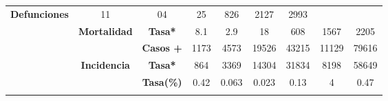 \begin{tabular}{ccc|cccccc|}
		\multirow{-2}{*}{\cellcolor[HTML]{FFFFC7}\textbf{Defunciones}} &
		\multicolumn{1}{c|}{\multirow{-2}{*}{\cellcolor[HTML]{FFFFC7}11}} &
		\multicolumn{1}{c|}{\multirow{-2}{*}{\cellcolor[HTML]{FFFFC7}04}} &
		\multicolumn{1}{c|}{\multirow{-2}{*}{\cellcolor[HTML]{FFFFC7}25}} &
		\multicolumn{1}{c|}{\multirow{-2}{*}{\cellcolor[HTML]{FFFFC7}826}} &
		\multicolumn{1}{c|}{\multirow{-2}{*}{\cellcolor[HTML]{FFFFC7}2127}} &
		\multirow{-2}{*}{\cellcolor[HTML]{FFFFC7}2993} \\ \cline{3-9} 
		\rowcolor[HTML]{FFFFC7} 
		\multicolumn{1}{|c|}{\cellcolor[HTML]{FFFFC7}} &
		\multicolumn{1}{c|}{\multirow{-2}{*}{\cellcolor[HTML]{FFFFC7}\textbf{Mortalidad}}} &
		\textbf{Tasa*} &
		\multicolumn{1}{c|}{\cellcolor[HTML]{FFFFC7}8.1} &
		\multicolumn{1}{c|}{\cellcolor[HTML]{FFFFC7}2.9} &
		\multicolumn{1}{c|}{\cellcolor[HTML]{FFFFC7}18} &
		\multicolumn{1}{c|}{\cellcolor[HTML]{FFFFC7}608} &
		\multicolumn{1}{c|}{\cellcolor[HTML]{FFFFC7}1567} &
		2205 \\ \cline{2-9} 
		\rowcolor[HTML]{FFFFC7} 
		\multicolumn{1}{|c|}{\cellcolor[HTML]{FFFFC7}} &
		\multicolumn{1}{c|}{\cellcolor[HTML]{FFFFC7}} &
		\textbf{Casos +} &
		\multicolumn{1}{c|}{\cellcolor[HTML]{FFFFC7}1173} &
		\multicolumn{1}{c|}{\cellcolor[HTML]{FFFFC7}4573} &
		\multicolumn{1}{c|}{\cellcolor[HTML]{FFFFC7}19526} &
		\multicolumn{1}{c|}{\cellcolor[HTML]{FFFFC7}43215} &
		\multicolumn{1}{c|}{\cellcolor[HTML]{FFFFC7}11129} &
		79616 \\ \cline{3-9} 
		\rowcolor[HTML]{FFFFC7} 
		\multicolumn{1}{|c|}{\multirow{-6}{*}{\cellcolor[HTML]{FFFFC7}\textbf{2021}}} &
		\multicolumn{1}{c|}{\multirow{-2}{*}{\cellcolor[HTML]{FFFFC7}\textbf{Incidencia}}} &
		\textbf{Tasa*} &
		\multicolumn{1}{c|}{\cellcolor[HTML]{FFFFC7}864} &
		\multicolumn{1}{c|}{\cellcolor[HTML]{FFFFC7}3369} &
		\multicolumn{1}{c|}{\cellcolor[HTML]{FFFFC7}14304} &
		\multicolumn{1}{c|}{\cellcolor[HTML]{FFFFC7}31834} &
		\multicolumn{1}{c|}{\cellcolor[HTML]{FFFFC7}8198} &
		58649 \\ \hline
		\rowcolor[HTML]{E2EFDA} 
		\multicolumn{1}{|c|}{\cellcolor[HTML]{E2EFDA}} &
		\multicolumn{1}{c|}{\cellcolor[HTML]{E2EFDA}} &
		\textbf{Tasa(\%)} 
		&\multicolumn{1}{c|}{\cellcolor[HTML]{E2EFDA}0.42} 
		&\multicolumn{1}{c|}{\cellcolor[HTML]{E2EFDA}0.063} 
		&\multicolumn{1}{c|}{\cellcolor[HTML]{E2EFDA}0.023} 
		&\multicolumn{1}{c|}{\cellcolor[HTML]{E2EFDA}0.13} 
		&\multicolumn{1}{c|}{\cellcolor[HTML]{E2EFDA}4} 
		&0.47 \\ \cline{3-9} 
		\rowcolor[HTML]{E2EFDA} 
		\multicolumn{1}{|c|}{\cellcolor[HTML]{E2EFDA}} 

\end{tabular}
